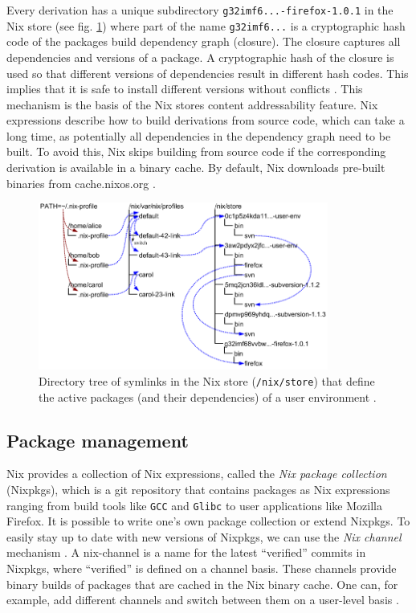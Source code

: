Every derivation has a unique subdirectory \verb|g32imf6...-firefox-1.0.1| in the Nix store (see fig. \ref{fig:nix-user-environments}) where part of the name \verb|g32imf6...| is a cryptographic hash code of the packages build dependency graph (closure). The closure captures all dependencies and versions of a package. A cryptographic hash of the closure is used so that different versions of dependencies result in different hash codes. This implies that it is safe to install different versions without conflicts \cite{vanDerBurg2012}. This mechanism is the basis of the Nix stores content addressability feature. 
Nix expressions describe how to build derivations from source code, which can take a long time, as potentially all dependencies in the dependency graph need to be built. To avoid this, Nix skips building from source code if the corresponding derivation is available in a binary cache. By default, Nix downloads pre-built binaries from cache.nixos.org \cite{NixPills1}.
\begin{figure}[h!]
  \centering
  \includegraphics[width=0.85\textwidth]{thesis/graphics/nix-user-environments.png}
  \caption{Directory tree of symlinks in the Nix store (\texttt{/nix/store}) that define the active packages (and their dependencies) of a user environment \cite{Profiles}.}
  \label{fig:nix-user-environments}
\end{figure}

\subsection{Package management}\label{nix-tools-package-management}
Nix provides a collection of Nix expressions, called the \emph{Nix package collection} (Nixpkgs), which is a git repository that contains packages as Nix expressions ranging from build tools like \verb|GCC| and \verb|Glibc| to user applications like Mozilla Firefox. It is possible to write one's own package collection or extend Nixpkgs. To easily stay up to date with new versions of Nixpkgs, we can use the \emph{Nix channel} mechanism \cite{NixPackageManagement}. A nix-channel is a name for the latest ``verified'' commits in Nixpkgs, where ``verified'' is defined on a channel basis. These channels provide binary builds of packages that are cached in the Nix binary cache. One can, for example, add different channels and switch between them on a user-level basis \cite{NixChannels}.

